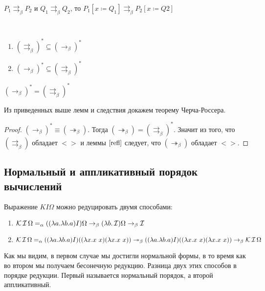 $P_{1}\rightrightarrows_{\beta}P_{2}$ и $Q_{1}\rightrightarrows_{\beta}Q_{2}$, то $P_{1}[x\coloneqq{}Q_{1}]\rightrightarrows_{\beta}P_{2}[x\coloneqq{}Q2]$

\begin{lemma}
	\
	\begin{enumerate}
		\item $(\rightrightarrows_{\beta})^{*} \subseteq (\to_{\beta})^{*}$
		\item $(\to_{\beta})^{*} \subseteq (\rightrightarrows_{\beta})^{*}$
	\end{enumerate}
\end{lemma}

\begin{cons}
	$(\to_{\beta})^{*}=(\rightrightarrows_{\beta})^{*}$
\end{cons}

Из приведенных выше лемм и следствия докажем теорему Черча-Россера.

\begin{proof}
	$(\to_{\beta})^{*}\equiv(\twoheadrightarrow_{\beta})$. Тогда $(\twoheadrightarrow_{\beta})=(\rightrightarrows_{\beta})^{*}$. Значит из того, что $(\rightrightarrows_{\beta})$ обладает $<>$ и леммы $\ref{refl}$ следует, что $(\twoheadrightarrow_{\beta})$ обладает $<>$.
\end{proof}

\subsection{Нормальный и аппликативный порядок вычислений}

\begin{example}
	Выражение $KI\Omega$ можно редуцировать двумя способами:
	\begin{enumerate}
		\item $\operatorname{\mathcal{K}} \operatorname{\mathcal{I}} \Omega =_{\alpha} ((\lambda{}a.\lambda{}b.a) I) \Omega \to_{\beta} (\lambda{}b.\operatorname{\mathcal{I}})\Omega  \to_{\beta} \operatorname{\mathcal{I}}$
		\item  $\comb K \comb I \Omega =_{\alpha} ((\lambda{}a.\lambda{}b.a) I)((\lambda{}x.x \ x) (\lambda{}x.x \ x)) \twoheadrightarrow_{\beta} ((\lambda{}a.\lambda{}b.a) I)((\lambda{}x.x \ x) (\lambda{}x.x \ x)) \to_{\beta} \comb K \comb I \Omega $
	\end{enumerate}
	
\end{example}

Как мы видим, в первом случае мы достигли нормальной формы, в то время как во втором мы получаем бесонечную редукцию. Разница двух этих способов в порядке редукции. Первый называется нормальный порядок, а второй аппликативный. 

